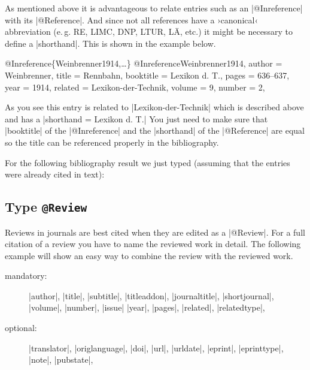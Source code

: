 \documentclass[a4paper,
10pt,
greek,
french,
spanish,
italian,
ngerman,
english,
]{ltxdoc}
\begin{document}
As mentioned above it is  advantageous to relate entries such as  an |@Inreference| with its |@Reference|. 
And since not all references have a ›canonical‹ abbreviation (e.\,g. RE, LIMC, DNP, LTUR, LÄ, etc.) it might be necessary to define a |shorthand|.
This is shown in the example below.
 
\begin{bibexample}[label=Weinbrenner1914]{{@}Inreference\{Weinbrenner1914,…\}}
@Inreference{Weinbrenner1914,
  author    = {Weinbrenner},
  title     = {Rennbahn},
  booktitle = {Lexikon d. T.},
  pages     = {636--637},
  year      = {1914},
  related   = {Lexikon-der-Technik},
  volume    = {9},
  number    = {2},
}
\end{bibexample}
As you see this entry is related to |Lexikon-der-Technik| which is described above and has a |shorthand = {Lexikon d. T.}|
You just need to make sure that  |booktitle| of the |@Inreference| and the |shorthand| of 
the  |@Reference| are equal so the title can be referenced properly in the bibliography.

For the following bibliography result we just typed (assuming that the entries were already cited in text):

\begin{refsection}
\nocite{Lexikon-der-Technik,Weinbrenner1914,LTUR,Neils1994}
\setlength{\labwidthsameline}{5em} 
\begin{example}
\printbibliography[keyword=corpus,title={Corpora}]
\printbibliography[notkeyword=corpus]
\end{example}
\end{refsection}


 
\subsection{Type \texttt{@Review}}\label{review}
Reviews in journals are best cited when they are edited as a |@Review|.
For a full citation of a review you have to name the reviewed work in detail.
The following example will show an easy way to combine the review with the reviewed work.

\begin{description}
\item[mandatory:] 
|author|, |title|, |subtitle|, |titleaddon|,
|journaltitle|, |shortjournal|, |volume|, |number|, |issue|
|year|, |pages|, 
|related|, |relatedtype|,
\item[optional:]
|translator|, |origlanguage|,
|doi|, |url|, |urldate|, |eprint|, |eprinttype|, |note|, |pubstate|, 
 \end{description}
\end{document}
